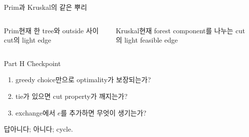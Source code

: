 \begin{frame}{Prim과 Kruskal의 같은 뿌리}
\begin{columns}[T]\begin{block}{Prim}현재 한 tree와 outside 사이 cut의 light edge\end{block}
\begin{block}{Kruskal}현재 forest component를 나누는 cut의 light feasible edge\end{block}\end{columns}
\end{frame}
\begin{frame}{Part H Checkpoint}
\begin{enumerate}\item greedy choice만으로 optimality가 보장되는가?\item tie가 있으면 cut property가 깨지는가?\item exchange에서 \(e\)를 추가하면 무엇이 생기는가?\end{enumerate}
\begin{exampleblock}{답}아니다; 아니다; cycle.\end{exampleblock}
\end{frame}
